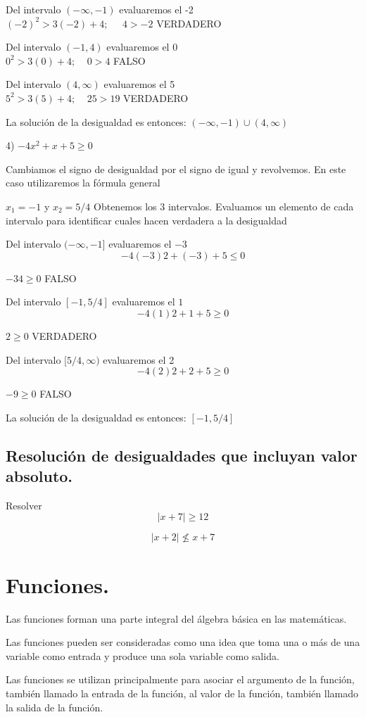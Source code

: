 \documentclass[oneside,spanish,letterpaper]{extbook}
\theoremstyle{mythmstyle}
\begin{document}
Del intervalo $(-\infty , -1)$ evaluaremos el -2\\
$(-2)^2 > 3(-2) + 4;\;\;\;\;\; 4 > -2$  VERDADERO

Del intervalo $(-1 , 4)$ evaluaremos el 0\\
$0^2 > 3(0) + 4;\;\;\;\; 0 > 4$ FALSO

Del intervalo $(4 , \infty )$ evaluaremos el 5\\
$5^2 > 3(5) + 4;\;\;\;\;25 > 19$ VERDADERO

La solución de la desigualdad es entonces: $(-\infty , -1) \cup (4 , \infty)$

4) $-4x^2 + x + 5 \geq 0$

Cambiamos el signo de desigualdad por el signo de igual y revolvemos. En este caso utilizaremos la fórmula general


$x_1 = -1$ y $x_2 = 5/4$
Obtenemos los 3 intervalos. Evaluamos un elemento de cada intervalo para identificar cuales hacen
verdadera a la desigualdad

Del intervalo $(-\infty , -1]$ evaluaremos el $-3$
$$-4(-3)2 + (-3) + 5 \leq 0$$

$-34 \geq 0$ FALSO

Del intervalo $[-1 , 5/4]$ evaluaremos el $1$
$$-4(1)2 + 1 + 5 \geq 0$$


$2 \geq 0$ VERDADERO

Del intervalo $[5/4 , \infty )$ evaluaremos el 2
$$-4(2)2 + 2 + 5 \geq 0$$


$-9 \geq 0$ FALSO

La solución de la desigualdad es entonces: $[-1 , 5/4]$
\cite{cd3}


\section{Resolución de desigualdades que incluyan valor absoluto.}
Resolver
$$|x+7|\geq 12$$

$$|x+2| \nleq x+7$$


\chapter{Funciones.}
Las funciones forman una parte integral del álgebra básica en las matemáticas.

Las funciones pueden ser consideradas como una idea que toma una o más de una variable como entrada y 
produce una sola variable como salida.

Las funciones se utilizan principalmente para asociar el argumento de la función, también llamado la entrada
de la función, al valor de la función, también llamado la salida de la función.
\end{document}
